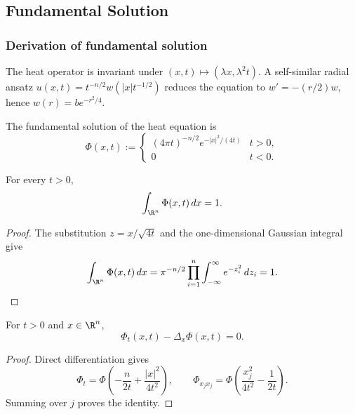 \subsection{Fundamental Solution}
\label{sec:heat-fundamental-solution}

\subsubsection{Derivation of fundamental solution}
\label{sec:heat-fundamental-solution-derivation}

The heat operator is invariant under $(x,t)\mapsto(\lambda x,\lambda^2t)$.
A self-similar radial ansatz
$u(x,t)=t^{-n/2}w(|x|t^{-1/2})$ reduces the equation to
$w'=-(r/2)w$, hence $w(r)=be^{-r^2/4}$.

\begin{definition}
\label{def:fundamental-solution-heat-equation}
\leanok
The fundamental solution of the heat equation is
$$\Phi(x,t):=
\begin{cases}
(4\pi t)^{-n/2}e^{-|x|^2/(4t)}&t>0,\\
0&t<0.
\end{cases}$$
\end{definition}

\begin{lemma}
\label{lem:integral-fundamental-solution-heat}
\leanok
{}
For every $t>0$,
$$\int_{\R^n}\Phi(x,t)\,dx=1.$$
\end{lemma}
\begin{proof}
\leanok
\sketch The substitution $z=x/\sqrt{4t}$ and the one-dimensional Gaussian
integral give
$$\int_{\R^n}\Phi(x,t)\,dx
=\pi^{-n/2}\prod_{i=1}^n\int_{-\infty}^\infty e^{-z_i^2}\,dz_i=1.$$
\end{proof}

\begin{lemma}
\label{lem:heat-kernel-solves-heat-equation}
\leanok
{}
For $t>0$ and $x\in\R^n$,
$$\Phi_t(x,t)-\Delta_x\Phi(x,t)=0.$$
\end{lemma}
\begin{proof}
\leanok
\sketch Direct differentiation gives
$$\Phi_t=\Phi\left(-\frac n{2t}+\frac{|x|^2}{4t^2}\right),
\qquad
\Phi_{x_jx_j}=\Phi\left(\frac{x_j^2}{4t^2}-\frac1{2t}\right).$$
Summing over $j$ proves the identity.
\end{proof}

